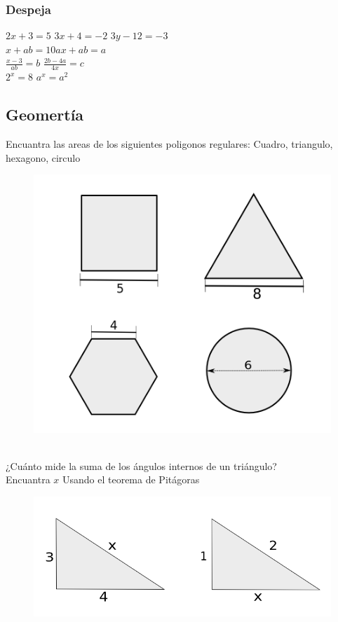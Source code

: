 \documentclass[a4paper,10pt]{article}
\begin{document}
\subsubsection*{Despeja}
$2x+3=5$ \hspace{2cm} $3x+4=-2$ \hspace{2cm} $3y-12=-3 $
\vspace{1cm}\\
 $x+ab=10$\hspace{2cm}$ax+ab=a$
\vspace{1cm}\\
$\frac{x-3}{ab}=b$\hspace{4cm} $\frac{2b-4a}{4x}=c$
\vspace{1cm}\\
$2^x=8$ \hspace{4cm} $a^x=a^2$
\pagebreak
\subsection*{Geomertía}

Encuantra las areas de los siguientes poligonos regulares:
Cuadro, triangulo, hexagono, circulo
\begin{figure}[h!]
\includegraphics[scale=0.5]{all.png}
\end{figure}
\vspace{2cm}\\
¿Cuánto mide la suma de los ángulos internos de un triángulo?
\vspace{1.5cm}\\
Encuantra $x$ Usando el teorema de Pitágoras
\begin{figure}[h!]
\includegraphics[scale=0.5]{pitagoras.png}
\end{figure}
\end{document}
